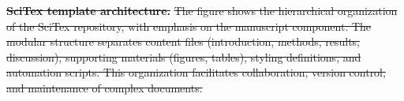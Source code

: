 \documentclass[preprint,review,12pt]{elsarticle}%
\providecommand{\DIFdeltex}[1]{{\protect\color{red}\sout{#1}}}                      %
\providecommand{\DIFdelFL}[1]{\DIFdel{#1}} %
\providecommand{\DIFdel}[1]{\texorpdfstring{\DIFdeltex{#1}}{}} %
\begin{document}
\begin{frontmatter}


{%
\textbf{\DIFdelFL{SciTex template architecture.}} %
\DIFdelFL{The figure shows the hierarchical organization of the SciTex repository, with emphasis on the manuscript component. The modular structure separates content files (introduction, methods, results, discussion), supporting materials (figures, tables), styling definitions, and automation scripts. This organization facilitates collaboration, version control, and maintenance of complex documents.}}



\end{frontmatter}
\end{document}
